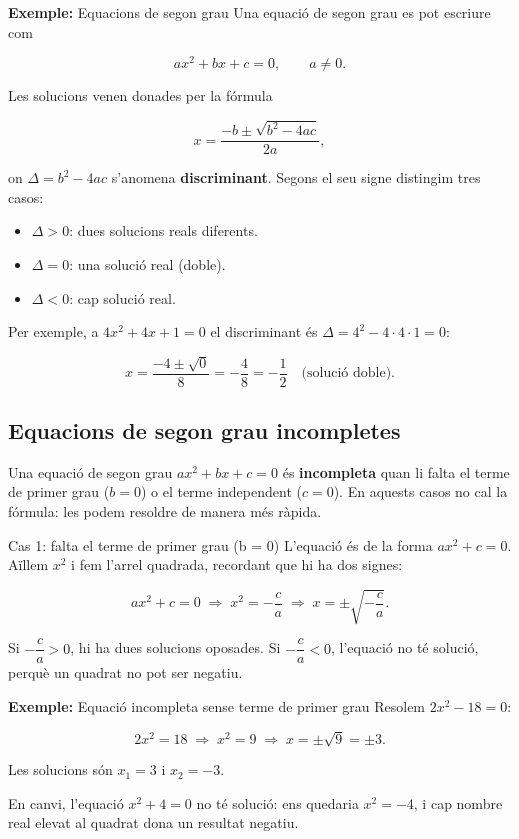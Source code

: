 \begin{exemple}{\textbf{Exemple:} Equacions de segon grau}
Una equació de segon grau es pot escriure com

\[
ax^2+bx+c=0, \qquad a\neq 0.
\]

Les solucions venen donades per la fórmula

\[
x=\frac{-b\pm\sqrt{b^2-4ac}}{2a},
\]

on $\Delta=b^2-4ac$ s'anomena \textbf{discriminant}. Segons el seu signe distingim tres casos:

\begin{itemize}
\item $\Delta>0$: dues solucions reals diferents.
\item $\Delta=0$: una solució real (doble).
\item $\Delta<0$: cap solució real.
\end{itemize}

Per exemple, a $4x^2+4x+1=0$ el discriminant és $\Delta=4^2-4\cdot4\cdot1=0$:

\[
x=\frac{-4\pm\sqrt{0}}{8}=-\frac{4}{8}=-\frac{1}{2} \quad \text{(solució doble)}.
\]
\end{exemple}

\subsection{Equacions de segon grau incompletes}

Una equació de segon grau $ax^2+bx+c=0$ és \textbf{incompleta} quan li falta el terme de primer grau ($b=0$) o el terme independent ($c=0$). En aquests casos no cal la fórmula: les podem resoldre de manera més ràpida.

\begin{definicio}{Cas 1: falta el terme de primer grau (b = 0)}
L'equació és de la forma $ax^2+c=0$. Aïllem $x^2$ i fem l'arrel quadrada, recordant que hi ha dos signes:

\[
ax^2+c=0 \;\Rightarrow\; x^2=-\frac{c}{a} \;\Rightarrow\; x=\pm\sqrt{-\frac{c}{a}}.
\]

Si $-\dfrac{c}{a}>0$, hi ha dues solucions oposades. Si $-\dfrac{c}{a}<0$, l'equació no té solució, perquè un quadrat no pot ser negatiu.
\end{definicio}

\begin{exemple}{\textbf{Exemple:} Equació incompleta sense terme de primer grau}
Resolem $2x^2-18=0$:

\[
2x^2=18 \;\Rightarrow\; x^2=9 \;\Rightarrow\; x=\pm\sqrt{9}=\pm 3.
\]

Les solucions són $x_1=3$ i $x_2=-3$.

En canvi, l'equació $x^2+4=0$ no té solució: ens quedaria $x^2=-4$, i cap nombre real elevat al quadrat dona un resultat negatiu.
\end{exemple}

